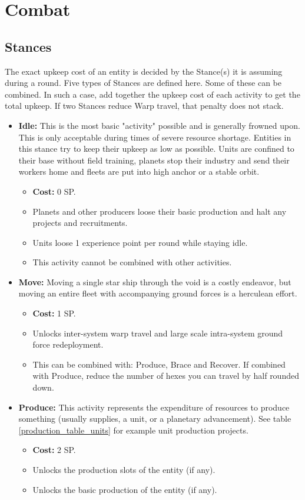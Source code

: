 \chapter{Combat}
\section{Stances}
The exact upkeep cost of an entity is decided by the Stance(s) it is assuming during a round. Five types of Stances are defined here. Some of these can be combined. In such a case, add together the upkeep cost of each activity to get the total upkeep. If two Stances reduce Warp travel, that penalty does not stack.

\begin{itemize}
	\item \textbf{Idle:} This is the most basic "activity" possible and is generally frowned upon. This is only acceptable during times of severe resource shortage. Entities in this stance try to keep their upkeep as low as possible. Units are confined to their base without field training, planets stop their industry and send their workers home and fleets are put into high anchor or a stable orbit.
	\begin{itemize}
		\item \textbf{Cost:} 0 SP.
		\item Planets and other producers loose their basic production and halt any projects and recruitments.
		\item Units loose 1 experience point per round while staying idle.
		\item This activity cannot be combined with other activities.
	\end{itemize}

	\item \textbf{Move:} Moving a single star ship through the void is a costly endeavor, but moving an entire fleet with accompanying ground forces is a herculean effort.
	\begin{itemize}
		\item \textbf{Cost:} 1 SP.
		\item Unlocks inter-system warp travel and large scale intra-system ground force redeployment.
		\item This can be combined with: Produce, Brace and Recover. If combined with Produce, reduce the number of hexes you can travel by half rounded down.
	\end{itemize}

	
	\item \textbf{Produce:} This activity represents the expenditure of resources to produce something (usually supplies, a unit, or a planetary advancement). See table \ref{production_table_units} for example unit production projects.
	\begin{itemize}
		\item \textbf{Cost:} 2 SP.
		\item Unlocks the production slots of the entity (if any).
		\item Unlocks the basic production of the entity (if any).
	\end{itemize}
	

\end{itemize}
